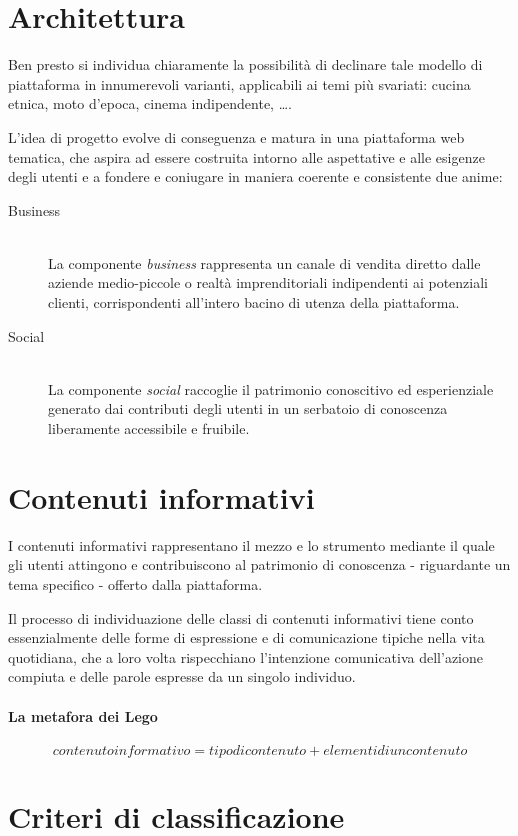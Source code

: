 
\section{Architettura}
\label{sec:progetto:architettura}
Ben presto si individua chiaramente la possibilità di declinare tale modello di piattaforma in innumerevoli varianti, applicabili ai temi più svariati: cucina etnica, moto d'epoca, cinema indipendente, \ldots .

L'idea di progetto evolve di conseguenza e matura in una piattaforma web tematica, che aspira ad essere costruita intorno alle aspettative e alle esigenze degli utenti e a fondere e coniugare in maniera coerente e consistente due anime:
\begin{description}
\item[Business] \hfill \\
La componente \textit{business} rappresenta un canale di vendita diretto dalle aziende medio-piccole o realtà imprenditoriali indipendenti ai potenziali clienti, corrispondenti all'intero bacino di utenza della piattaforma.
\item[Social] \hfill \\
La componente \textit{social} raccoglie il patrimonio conoscitivo ed esperienziale generato dai contributi degli utenti in un serbatoio di conoscenza liberamente accessibile e fruibile.
\end{description}

\section{Contenuti informativi}
\label{sec:progetto:contenuti}
I contenuti informativi rappresentano il mezzo e lo strumento mediante il quale gli utenti attingono e contribuiscono al patrimonio di conoscenza - riguardante un tema specifico - offerto dalla piattaforma.

Il processo di individuazione delle classi di contenuti informativi tiene conto essenzialmente delle forme di espressione e di comunicazione tipiche nella vita quotidiana, che a loro volta rispecchiano l'intenzione comunicativa dell'azione compiuta e delle parole espresse da un singolo individuo.

\paragraph{La metafora dei Lego}
$$ contenuto informativo = tipo di contenuto + elementi di un contenuto $$

\section{Criteri di classificazione}
\label{sec:progetto:classificazione}
